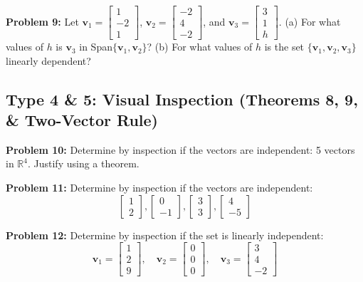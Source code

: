 \documentclass[12pt]{article}
\begin{document}
\textbf{Problem 9:} Let $\mathbf{v}_1 = \begin{bmatrix} 1 \\ -2 \\ 1 \end{bmatrix}$, $\mathbf{v}_2 = \begin{bmatrix} -2 \\ 4 \\ -2 \end{bmatrix}$, and $\mathbf{v}_3 = \begin{bmatrix} 3 \\ 1 \\ h \end{bmatrix}$. 
\newline (a) For what values of $h$ is $\mathbf{v}_3$ in Span$\{\mathbf{v}_1, \mathbf{v}_2\}$?
\newline (b) For what values of $h$ is the set $\{\mathbf{v}_1, \mathbf{v}_2, \mathbf{v}_3\}$ linearly dependent?

\subsection*{Type 4 \& 5: Visual Inspection (Theorems 8, 9, \& Two-Vector Rule)}
\textbf{Problem 10:} Determine by inspection if the vectors are independent: 5 vectors in $\mathbb{R}^4$. Justify using a theorem.

\textbf{Problem 11:} Determine by inspection if the vectors are independent:
$$ \begin{bmatrix} 1 \\ 2 \end{bmatrix}, \begin{bmatrix} 0 \\ -1 \end{bmatrix}, \begin{bmatrix} 3 \\ 3 \end{bmatrix}, \begin{bmatrix} 4 \\ -5 \end{bmatrix} $$

\textbf{Problem 12:} Determine by inspection if the set is linearly independent:
$$ \mathbf{v}_1 = \begin{bmatrix} 1 \\ 2 \\ 9 \end{bmatrix}, \quad \mathbf{v}_2 = \begin{bmatrix} 0 \\ 0 \\ 0 \end{bmatrix}, \quad \mathbf{v}_3 = \begin{bmatrix} 3 \\ 4 \\ -2 \end{bmatrix} $$
\end{document}
